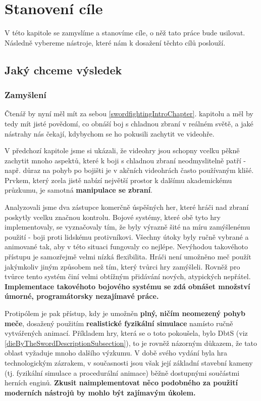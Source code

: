 \chapter{Stanovení cíle}

V této kapitole se zamyslíme a stanovíme cíle, o něž tato práce bude usilovat. Následně vybereme nástroje, které nám k dosažení těchto cílů poslouží.  


\section{Jaký chceme výsledek}

\subsection{Zamyšlení}
Čtenář by nyní měl mít za sebou \ref{swordfightingIntroChapter}. kapitolu a měl by tedy mít jisté povědomí, co obnáší boj s chladnou zbraní v reálném světě, a jaké nástrahy nás čekají, kdybychom se ho pokusili zachytit ve videohře. 

V předchozí kapitole jsme si ukázali, že videohry jsou schopny vcelku pěkně zachytit mnoho aspektů, které k boji s chladnou zbraní neodmyslitelně patří - např. důraz na pohyb po bojišti je v akčních videohrách často používaným klišé. Prvkem, který zcela jistě nabízí největší prostor k dalšímu akademickému průzkumu, je samotná \textbf{manipulace se zbraní}.

Analyzovali jsme dva zástupce komerčně úspěšných her, které hráči nad zbraní poskytly vcelku značnou kontrolu. Bojové systémy, které obě tyto hry implementovaly, se vyznačovaly tím, že byly výrazně šité na míru zamýšlenému použití - boji proti lidskému protivníkovi. Všechny útoky byly ručně vybrané a animované tak, aby v této situaci fungovaly co nejlépe. Nevýhodou takovéhoto přístupu je samozřejmě velmi nízká flexibilita. Hráči není umožněno meč použít jakýmkoliv jiným způsobem než tím, který tvůrci hry zamýšleli. Rovněž pro tvůrce tento systém činí velmi obtížným přidávání nových, atypických nepřátel. \textbf{Implementace takovéhoto bojového systému se zdá obnášet množství úmorné, programátorsky nezajímavé práce.}

Protipólem je pak přístup, kdy je umožněn \textbf{plný, ničím neomezený pohyb meče}, dosažený použitím \textbf{realistické fyzikální simulace} namísto ručně vytvářených animací. Příkladem hry, která se o toto pokoušela, bylo \acl{DbtS} (viz \ref{dieByTheSwordDescriptionSubsection}), to je rovněž názorným důkazem, že tato oblast vyžaduje mnoho dalšího výzkumu. V době svého vydání byla hra technologickým zázrakem, v současnosti jsou však její základní stavební kameny (tj. fyzikální simulace a procedurální animace) běžně dostupnými součástmi herních enginů. \textbf{Zkusit naimplementovat něco podobného za použití moderních nástrojů by mohlo být zajímavým úkolem.}

